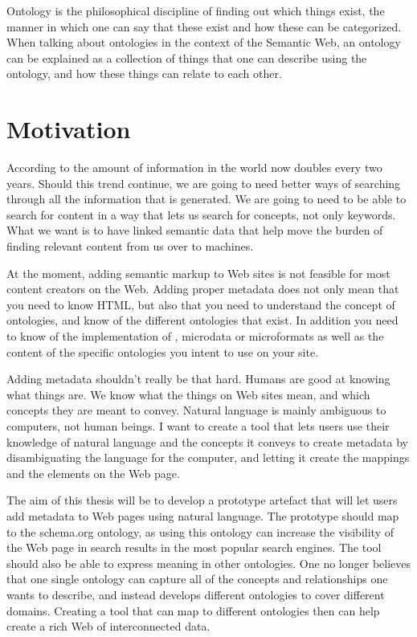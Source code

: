 Ontology is the philosophical discipline of finding out which things exist,
the manner in which one can say that these exist and how these can be categorized.
When talking about ontologies in the context of the Semantic Web,
an ontology can be explained as a collection of things that one can describe using the ontology,
and how these things can relate to each other.


\section{Motivation}
According to \citet{Gantz2011} the amount of information in the world now doubles every two years.
Should this trend continue, we are going to need better ways of searching through all the information that is generated.
We are going to need to be able to search for content in a way that lets us search for concepts, not only keywords.
What we want is to have linked semantic data that help move the burden of finding relevant content from us over to machines.

At the moment, adding semantic markup to Web sites is not feasible for most content creators on the Web.
Adding proper metadata does not only mean that you need to know HTML,
but also that you need to understand the concept of ontologies, and know of the different ontologies that exist.
In addition you need to know of the implementation of , microdata or microformats
as well as the content of the specific ontologies you intent to use on your site.

Adding metadata shouldn't really be that hard.
Humans are good at knowing what things are.
We know what the things on Web sites mean, and which concepts they are meant to convey.
Natural language is mainly ambiguous to computers, not human beings.
I want to create a tool that lets users use their knowledge of natural language and the concepts it conveys
to create metadata by disambiguating the language for the computer, and letting it create the mappings and the elements on the Web page.

The aim of this thesis will be to develop a prototype artefact that will let users add metadata to Web pages using natural language.
The prototype should map to the schema.org ontology,
as using this ontology can increase the visibility of the Web page in search results in the most popular search engines.
The tool should also be able to express meaning in other ontologies.
One no longer believes that one single ontology can capture all of the concepts and relationships one wants to describe,
and instead develops different ontologies to cover different domains.
Creating a tool that can map to different ontologies then can help create a rich Web of interconnected data.


